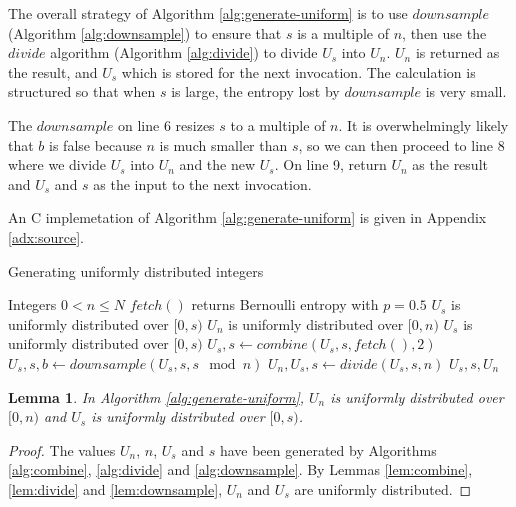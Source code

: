 \documentclass[12pt]{article}
\newtheorem{lemma}{Lemma}
\begin{document}
The overall strategy of Algorithm \ref{alg:generate-uniform} is to use $downsample$ (Algorithm \ref{alg:downsample}) to ensure that $s$ is a multiple of $n$, then use the $divide$ algorithm (Algorithm \ref{alg:divide}) to divide $U_s$ into $U_n$. $U_n$ is returned as the result, and $U_s$ which is stored for the next invocation. The calculation is structured so that when $s$ is large, the entropy lost by $downsample$ is very small.

The $downsample$ on line 6 resizes $s$ to a multiple of $n$. It is overwhelmingly likely that $b$ is false because $n$ is much smaller than $s$, so we can then proceed to line 8 where we divide $U_s$ into $U_n$ and the new $U_s$. On line 9, return $U_n$ as the result and $U_s$ and $s$ as the input to the next invocation.

An C implemetation of Algorithm \ref{alg:generate-uniform} is given in Appendix \ref{adx:source}.

\begin{algorithm}
\caption{Generating uniformly distributed integers}
\label{alg:generate-uniform}
\begin{algorithmic}[1]
\Require Integers $0 < n\le N$
\Require $fetch()$ returns Bernoulli entropy with $p=0.5$
\Require $U_s$ is uniformly distributed over $[0,s)$
\Ensure $U_n$ is uniformly distributed over $[0,n)$
\Ensure $U_s$ is uniformly distributed over $[0,s)$
        \State $U_s, s \gets combine(U_s, s, fetch(), 2)$
    \EndWhile
    \State $U_s, s, b \gets downsample(U_s, s, s \mod n)$ 
        \State $U_n, U_s, s \gets divide(U_s, s, n)$
        \State \Return $U_s, s, U_n$
    \EndIf
  \EndWhile
\EndProcedure
\end{algorithmic}
\end{algorithm}

\begin{lemma}
    In Algorithm \ref{alg:generate-uniform}, 
$U_n$ is uniformly distributed over $[0,n)$ and 
$U_s$ is uniformly distributed over $[0,s)$.
\end{lemma}

\begin{proof}
The values $U_n$, $n$, $U_s$ and $s$ have been generated by Algorithms \ref{alg:combine}, \ref{alg:divide} and \ref{alg:downsample}. By Lemmas \ref{lem:combine}, \ref{lem:divide} and \ref{lem:downsample}, $U_n$ and $U_s$ are uniformly distributed.
\end{proof}
\end{document}
